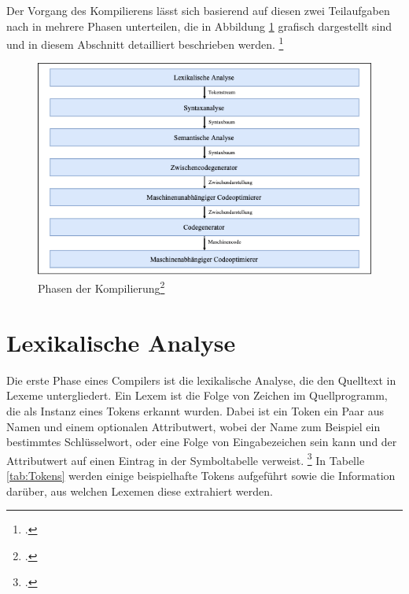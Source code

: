 Der Vorgang des Kompilierens lässt sich basierend auf diesen zwei Teilaufgaben nach \citeauthor{Ullmann2008} in mehrere Phasen unterteilen,  die in Abbildung \ref{fig:Compilerphasen} grafisch dargestellt sind und in diesem Abschnitt detailliert beschrieben werden.  \footcite[Vgl.][S. 6]{Ullmann2008}

\begin{figure}[!ht]
 \includegraphics[width=\textwidth,keepaspectratio]{Images/Compiler/Phasen.png}
 \caption[Phasen der Kompilierung]{Phasen der Kompilierung\protect\footcite{Ullmann2008}}
 \label{fig:Compilerphasen}
\end{figure}


\section{Lexikalische Analyse}
Die erste Phase eines Compilers ist die lexikalische Analyse,  die den Quelltext in Lexeme untergliedert.  Ein Lexem ist die Folge von Zeichen im Quellprogramm,  die als Instanz eines Tokens erkannt wurden.  Dabei ist ein Token ein Paar aus Namen und einem optionalen Attributwert,  wobei der Name zum Beispiel ein bestimmtes Schlüsselwort, oder eine Folge von Eingabezeichen sein kann und der Attributwert auf einen Eintrag in der Symboltabelle verweist.  \footcite[Vgl.][S. 135 f.]{Ullmann2008} In Tabelle \ref{tab:Tokens} werden einige beispielhafte Tokens aufgeführt sowie die Information darüber, aus welchen Lexemen diese extrahiert werden.

